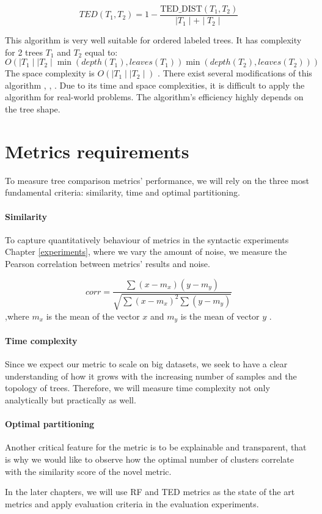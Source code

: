 $$
TED(T_1, T_2) = 1 - \frac{\text{TED\_DIST}(T_1, T_2)}{\mid T_1 \mid + \mid T_2 \mid}
$$

This algorithm is very well suitable for ordered labeled trees. It has complexity for 2 trees $T_1$ and $T_2$ equal to: $$O(\mid T_1 \mid \mid T_2 \mid  \min(depth(T_1),leaves(T_1))  \min(depth(T_2),leaves(T_2)))$$
The space complexity is $O(\mid T_1 \mid  \mid T_2 \mid )$ \cite{Zhang1989}. There exist several modifications of this algorithm \cite{Tai1979}, \cite{Pawlik2011}, \cite{Pawlik2017}. Due to its time and space complexities, it is difficult to apply the algorithm for real-world problems. The algorithm's efficiency highly depends on the tree shape.


\section{Metrics requirements}
To measure tree comparison metrics' performance, we will rely on the three most fundamental criteria: similarity, time and optimal partitioning. 
\paragraph{Similarity} To capture quantitatively behaviour of metrics in the syntactic experiments Chapter \ref{experiments}, where we vary the amount of noise, we measure the Pearson correlation between metrics' results and noise. 

$$
corr = \frac{\sum(x-m_x)(y-m_y)}{\sqrt{\sum(x-m_x)^2 \sum(y-m_y)}}
$$
,where $m_x$ is the mean of the vector $x$ and $m_y$ is the mean of vector $y$ \cite{pearson}.

\paragraph{Time complexity} Since we expect our metric to scale on big datasets, we seek to have a clear understanding of how it grows with the increasing number of samples and the topology of trees. Therefore, we will measure time complexity not only analytically but practically as well.   

\paragraph{Optimal partitioning} Another critical feature for the metric is to be explainable and transparent, that is why we would like to observe how the optimal number of clusters correlate with the similarity score of the novel metric. 

In the later chapters, we will use RF and TED metrics as the state of the art metrics and apply evaluation criteria in the evaluation experiments.
